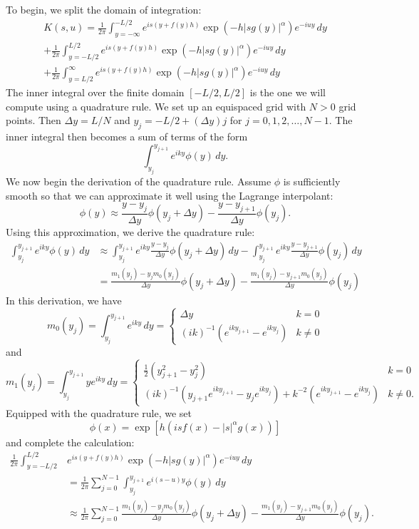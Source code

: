 \documentclass[11pt,letterpaper]{article}
\begin{document}
To begin, we split the domain of integration:
\begin{multline*}
K(s,u) = \frac{1}{2 \pi} \int_{y=-\infty}^{-L/2} e^{is\left(y+f(y)h\right)}\exp{\left(  -h |s g(y)|^{\alpha} \right)}e^{-iuy}\, dy \\
 + \frac{1}{2 \pi} \int_{y=-L/2}^{L/2} e^{is\left(y+f(y)h\right)}\exp{\left(  -h |s g(y)|^{\alpha} \right)}e^{-iuy}\, dy \\
 + \frac{1}{2 \pi} \int_{y=L/2}^{\infty} e^{is\left(y+f(y)h\right)}\exp{\left(  -h |s g(y)|^{\alpha} \right)}e^{-iuy}\, dy
\end{multline*}
The inner integral over the finite domain $[-L/2, L/2]$ is the one we will compute using a quadrature rule.  We set up an equispaced grid with $N > 0$ grid points.  Then $\Delta y = L/N$ and $y_j = -L/2 + (\Delta y) j$ for $j = 0, 1, 2, \ldots, N-1$.  The inner integral then becomes a sum of terms of the form
\[
\int_{y_j}^{y_{j+1}} e^{i k y} \phi(y) \, dy.
\]
We now begin the derivation of the quadrature rule.  Assume $\phi$ is sufficiently smooth so that we can approximate it well using the Lagrange interpolant:
\[
\phi(y) \approx \frac{y - y_j}{\Delta y} \phi(y_j + \Delta y) - \frac{y - y_{j+1}}{\Delta y} \phi(y_j).
\]
Using this approximation, we derive the quadrature rule:
\begin{align}
\int_{y_j}^{y_{j+1}} e^{i k y} \phi(y) \, dy &\approx \int_{y_j}^{y_{j+1}} e^{i k y} \frac{y - y_j}{\Delta y} \phi(y_j + \Delta y) \, dy - \int_{y_j}^{y_{j+1}} e^{i k y} \frac{y - y_{j+1}}{\Delta y} \phi(y_j) \, dy \nonumber \\
\label{eqn:quadrule}
 &= \frac{m_1(y_j) - y_j m_0(y_j)}{\Delta y} \phi(y_j + \Delta y) - \frac{m_1(y_j) - y_{j+1} m_0(y_j)}{\Delta y} \phi(y_j) 
\end{align}
In this derivation, we have
\[
m_0(y_j) = \int_{y_j}^{y_{j+1}} e^{i k y} \, dy = \begin{cases} \Delta y & k=0 \\ (ik)^{-1} (e^{i k y_{j+1}} - e^{i k y_j}) & k \neq 0 \end{cases}
\]
and
\[
m_1(y_j) = \int_{y_j}^{y_{j+1}} y e^{i k y} \, dy = \begin{cases} \frac{1}{2} (y_{j+1}^2 - y_j^2) & k = 0 \\ (i k)^{-1}( y_{j+1} e^{i k y_{j+1}} - y_j e^{i k y_j}) + k^{-2} (e^{i k y_{j+1}} - e^{i k y_j}) & k \neq 0. \end{cases}
\]
Equipped with the quadrature rule, we set
\[
\phi(x) = \exp \left[ h (i s f(x) - |s|^\alpha g(x)) \right]
\]
and complete the calculation:
\begin{align}
\frac{1}{2 \pi} \int_{y=-L/2}^{L/2} & e^{is\left(y+f(y)h\right)}\exp{\left(  -h |s g(y)|^{\alpha} \right)}e^{-iuy}\, dy \nonumber \\
&= \frac{1}{2 \pi} \sum_{j=0}^{N-1} \int_{y_j}^{y_{j+1}} e^{i (s-u) y} \phi(y) \, dy \nonumber \\
\label{eqn:quadcalc}
&\approx \frac{1}{2 \pi} \sum_{j=0}^{N-1} \frac{m_1(y_j) - y_j m_0(y_j)}{\Delta y} \phi(y_j + \Delta y) - \frac{m_1(y_j) - y_{j+1} m_0(y_j)}{\Delta y} \phi(y_j).
\end{align}
\end{document}
